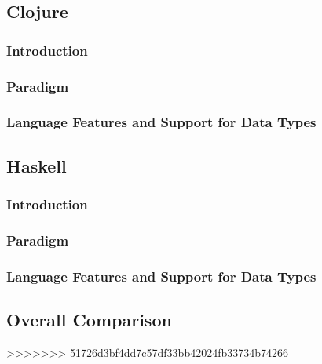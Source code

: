 \subsection*{Clojure}
\subsubsection*{Introduction}
\subsubsection*{Paradigm}
\subsubsection*{Language Features and Support for Data Types}
\subsection*{Haskell}
\subsubsection*{Introduction}
\subsubsection*{Paradigm}
\subsubsection*{Language Features and Support for Data Types}
\subsection*{Overall Comparison}
>>>>>>> 51726d3bf4dd7c57df33bb42024fb33734b74266
